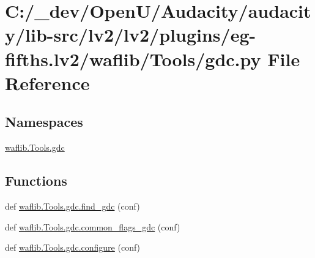 \hypertarget{lv2_2plugins_2eg-fifths_8lv2_2waflib_2_tools_2gdc_8py}{}\section{C\+:/\+\_\+dev/\+Open\+U/\+Audacity/audacity/lib-\/src/lv2/lv2/plugins/eg-\/fifths.lv2/waflib/\+Tools/gdc.py File Reference}
\label{lv2_2plugins_2eg-fifths_8lv2_2waflib_2_tools_2gdc_8py}
\subsection*{Namespaces}
\begin{DoxyCompactItemize}
\item 
 \hyperlink{namespacewaflib_1_1_tools_1_1gdc}{waflib.\+Tools.\+gdc}
\end{DoxyCompactItemize}
\subsection*{Functions}
\begin{DoxyCompactItemize}
\item 
def \hyperlink{namespacewaflib_1_1_tools_1_1gdc_a1cd5f335a15d375707119a14d470eb68}{waflib.\+Tools.\+gdc.\+find\+\_\+gdc} (conf)
\item 
def \hyperlink{namespacewaflib_1_1_tools_1_1gdc_a559e20c4ab6c3d2f15571b2a6abcebff}{waflib.\+Tools.\+gdc.\+common\+\_\+flags\+\_\+gdc} (conf)
\item 
def \hyperlink{namespacewaflib_1_1_tools_1_1gdc_aa2ddc4f30ce9ee26ba9d494193c2efae}{waflib.\+Tools.\+gdc.\+configure} (conf)
\end{DoxyCompactItemize}
